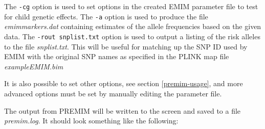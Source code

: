 \documentclass[a4paper,12pt]{article}
\newcommand{\code}[1]{{\footnotesize{{\tt #1}}}}
\begin{document}
The \code{-cg} option is used to set options in the created EMIM parameter file to test for child genetic effects. The \code{-a} option is used to produce the file {\it emimmarkers.dat} containing estimates of the allele frequencies based on the given data. The \code{-rout snplist.txt} option is used to output a listing of the risk alleles to the file {\it snplist.txt}. This will be useful for matching up the SNP ID used by EMIM with the original SNP names as specified in the PLINK map file {\it exampleEMIM.bim} 

It is also possible to set other options, see  section \ref{premim-usage}, and more advanced options must be set by manually editing the parameter file. 

The output from PREMIM will be written to the screen and saved to a file {\it premim.log}. It should look something like the following: 
\end{document}
